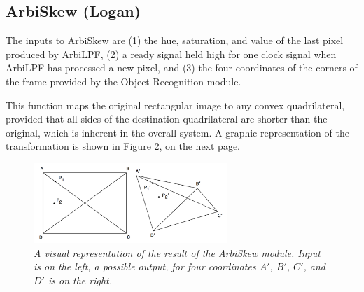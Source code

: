 \documentclass[10pt]{article}
\begin{document}
\subsection{ArbiSkew (Logan)}
The inputs to ArbiSkew are (1) the hue, saturation, and value of the last pixel produced by ArbiLPF, (2) a ready signal held high for one clock signal when ArbiLPF has processed a new pixel, and (3) the four coordinates of the corners of the frame provided by the Object Recognition module.

This function maps the original rectangular image to any convex quadrilateral, provided that all sides of the destination quadrilateral are shorter than the original, which is inherent in the overall system. A graphic representation of the transformation is shown in Figure 2, on the next page.

\begin{figure}[h!]
\centering
\includegraphics[width=0.65\textwidth]{arbiskew_graphic.png}
\caption{\emph{A visual representation of the result of the ArbiSkew module. Input is on the left, a possible output, for four coordinates $A\prime$, $B\prime$, $C\prime$, and $D\prime$ is on the right.}}
\end{figure}
\end{document}
